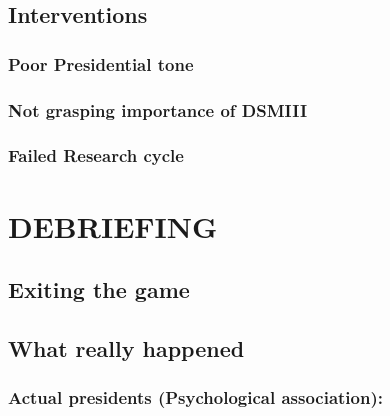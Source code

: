 \section{Interventions}
\label{interventions}

\subsection{Poor Presidential tone}
\label{poorpresidentialtone}

\subsection{Not grasping importance of DSMIII}
\label{notgraspingimportanceofdsmiii}

\subsection{Failed Research cycle}
\label{failedresearchcycle}

\pagebreak 

\chapter{DEBRIEFING}
\label{debriefing}

\section{Exiting the game}
\label{exitingthegame}

\section{What really happened}
\label{whatreallyhappened}

\subsection{Actual presidents (Psychological association):}
\label{actualpresidentspsychologicalassociation:}

